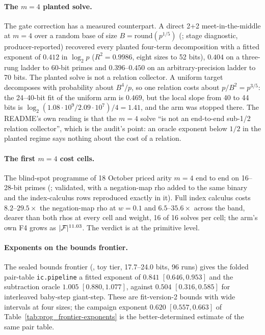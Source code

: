 \paragraph{The $m=4$ planted solve.} The gate correction has a measured
counterpart. A direct 2+2 meet-in-the-middle at $m=4$ over a random base of
size $B=\mathrm{round}(p^{1/5})$ (;
stage diagnostic, producer-reported) recovered every planted four-term
decomposition with a fitted exponent of $0.412$ in $\log_2 p$ ($R^2=0.9986$,
eight sizes to 52 bits), $0.404$ on a three-rung ladder to 60-bit primes
and $0.396$--$0.450$ on an arbitrary-precision ladder to 70 bits. The
planted solve is not a relation collector. A uniform target decomposes
with probability about $B^4/p$, so one relation costs about $p/B^2=p^{3/5}$:
the 24--40-bit fit of the uniform arm is $0.469$, but the local slope from
40 to 44 bits is $\log_2(1.08\cdot10^9/2.09\cdot10^7)/4=1.41$, and the arm
was stopped there. The README's own reading is that the $m=4$ solve ``is not
an end-to-end sub-1/2 relation collector'', which is the audit's point:
an oracle exponent below $1/2$ in the planted regime says nothing about
the cost of a relation.

\paragraph{The first $m=4$ cost cells.} The blind-spot programme of 18
October priced arity $m=4$ end to end on 16--28-bit primes
(; validated, with a
negation-map rho added to the same binary and the index-calculus rows
reproduced exactly in it). Full index calculus costs $8.2$--$29.5\times$ the
negation-map rho at $w=0.1$ and $6.5$--$35.6\times$ across the band, dearer
than both rhos at every cell and weight, 16 of 16 solves per cell; the
arm's own F4 grows as $\lvert \mathcal{F} \rvert^{11.03}$. The verdict is 
at the primitive level.

\paragraph{Exponents on the bounds frontier.} The sealed bounds frontier
(, toy tier, 17.7--24.0 bits, 96 runs) gives
the folded pair-table \texttt{ic.pipeline} a fitted exponent of $0.841$
$[0.646,0.953]$ and the subtraction oracle $1.005$ $[0.880,1.077]$, against
$0.504$ $[0.316,0.585]$ for interleaved baby-step giant-step. These are
fit-version-2 bounds with wide intervals at four sizes; the campaign
exponent $0.620$ $[0.557,0.663]$ of Table~\ref{tab:prog_frontier-exponents}
is the better-determined estimate of the same pair table.

